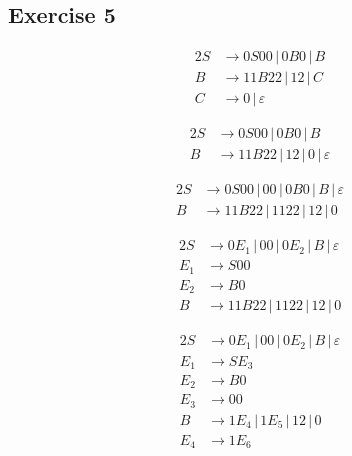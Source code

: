 {\subsection{Exercise 5}
\begin{center}
\begin{minipage}[c]{0.3\textwidth} \begin{alignat*}{2}
	S &\rightarrow 0S00\,|\,0B0\,|\,B\\
	B &\rightarrow 11B22\,|\,12\,|\,C\\
	C &\rightarrow 0\,|\,\varepsilon
\end{alignat*} \end{minipage}%
\begin{minipage}[c]{0.3\textwidth} \begin{alignat*}{2}
	S &\rightarrow 0S00\,|\,0B0\,|\,B\\
	B &\rightarrow 11B22\,|\,12\,|\,0\,|\,\varepsilon
\end{alignat*} \end{minipage}%
\begin{minipage}[c]{0.4\textwidth} \begin{alignat*}{2}
	S &\rightarrow 0S00\,|\,00\,|\,0B0\,|\,B\,|\,\varepsilon\\
	B &\rightarrow 11B22\,|\,1122\,|\,12\,|\,0
\end{alignat*} \end{minipage}
\end{center}
\begin{center}
\begin{minipage}[c]{0.3\textwidth} \begin{alignat*}{2}
	S &\rightarrow 0E_1\,|\,00\,|\,0E_2\,|\,B\,|\,\varepsilon\\
	E_1 &\rightarrow S00\\
	E_2 &\rightarrow B0\\
	B &\rightarrow 11B22\,|\,1122\,|\,12\,|\,0
\end{alignat*} \end{minipage}%
\begin{minipage}[c]{0.3\textwidth} \begin{alignat*}{2}
	S &\rightarrow 0E_1\,|\,00\,|\,0E_2\,|\,B\,|\,\varepsilon\\
	E_1 &\rightarrow SE_3\\
	E_2 &\rightarrow B0\\
	E_3 &\rightarrow 00\\
	B &\rightarrow 1E_4\,|\,1E_5\,|\,12\,|\,0\\
	E_4 &\rightarrow 1E_6\\

\end{alignat*}
\end{minipage}
\end{center}}
